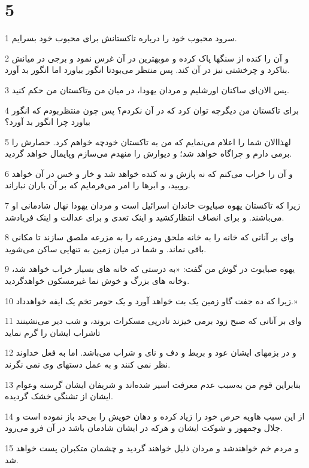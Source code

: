 \chapter{5}

\par 1 سرود محبوب خود را درباره تاکستانش برای محبوب خود بسرایم.
\par 2 و آن را کنده از سنگها پاک کرده و موبهترین در آن غرس نمود و برجی در میانش بناکرد و چرخشتی نیز در آن کند. پس منتظر می‌بودتا انگور بیاورد اما انگور بد آورد.
\par 3 پس الان‌ای ساکنان اورشلیم و مردان یهودا، در میان من وتاکستان من حکم کنید. 
\par 4 برای تاکستان من دیگرچه توان کرد که در آن نکردم؟ پس چون منتظربودم که انگور بیاورد چرا انگور بد آورد؟
\par 5 لهذاالان شما را اعلام می‌نمایم که من به تاکستان خودچه خواهم کرد. حصارش را برمی دارم و چراگاه خواهد شد؛ و دیوارش را منهدم می‌سازم وپایمال خواهد گردید.
\par 6 و آن را خراب می‌کنم که نه پازش و نه کنده خواهد شد و خار و خس در آن خواهد رویید، و ابرها را امر می‌فرمایم که بر آن باران نباراند.
\par 7 زیرا که تاکستان یهوه صبایوت خاندان اسرائیل است و مردان یهودا نهال شادمانی او می‌باشند. و برای انصاف انتظارکشید و اینک تعدی و برای عدالت و اینک فریادشد.
\par 8 وای بر آنانی که خانه را به خانه ملحق ومزرعه را به مزرعه ملصق سازند تا مکانی باقی نماند. و شما در میان زمین به تنهایی ساکن می‌شوید.
\par 9 یهوه صبایوت در گوش من گفت: «به درستی که خانه های بسیار خراب خواهد شد، وخانه های بزرگ و خوش نما غیرمسکون خواهدگردید.
\par 10 زیرا که ده جفت گاو زمین یک بت خواهد آورد و یک حومر تخم یک ایفه خواهدداد.»
\par 11 وای بر آنانی که صبح زود برمی خیزند تادر‌پی مسکرات بروند، و شب دیر می‌نشینند تاشراب ایشان را گرم نماید
\par 12 و در بزمهای ایشان عود و بربط و دف و نای و شراب می‌باشد. اما به فعل خداوند نظر نمی کنند و به عمل دستهای وی نمی نگرند.
\par 13 بنابراین قوم من به‌سبب عدم معرفت اسیر شده‌اند و شریفان ایشان گرسنه وعوام ایشان از تشنگی خشک گردیده.
\par 14 از این سبب هاویه حرص خود را زیاد کرده و دهان خویش را بی‌حد باز نموده است و جلال وجمهور و شوکت ایشان و هر‌که در ایشان شادمان باشد در آن فرو می‌رود.
\par 15 و مردم خم خواهندشد و مردان ذلیل خواهند گردید و چشمان متکبران پست خواهد شد.

